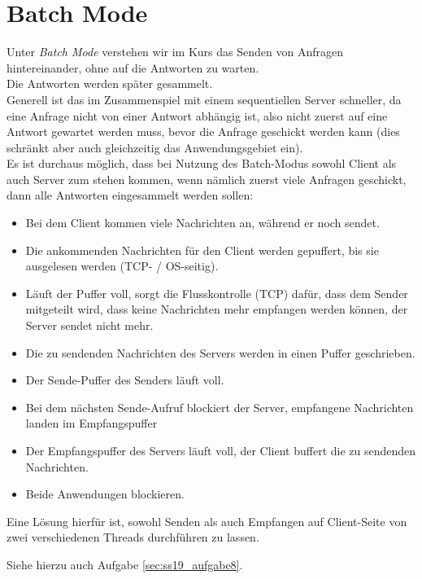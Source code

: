 \section{Batch Mode}

Unter \textit{Batch Mode} verstehen wir im Kurs das Senden von Anfragen hintereinander, ohne auf die Antworten zu warten.\\
Die Antworten werden später gesammelt.\\
Generell ist das im Zusammenspiel mit einem sequentiellen Server schneller, da eine Anfrage nicht von einer Antwort abhängig ist, also nicht zuerst auf eine Antwort gewartet werden muss, bevor die Anfrage geschickt werden kann (dies schränkt aber auch gleichzeitig das Anwendungsgebiet ein).\\
Es ist durchaus möglich, dass bei Nutzung des Batch-Modus sowohl Client als auch Server zum stehen kommen, wenn nämlich zuerst viele Anfragen geschickt, dann alle Antworten eingesammelt werden sollen:\\

\begin{itemize}
    \item Bei dem Client kommen viele Nachrichten an, während er noch sendet.
    \item Die ankommenden Nachrichten für den Client werden gepuffert, bis sie ausgelesen werden (TCP- / OS-seitig).
    \item Läuft der Puffer voll, sorgt die Flusskontrolle (TCP) dafür, dass dem Sender mitgeteilt wird, dass keine Nachrichten mehr empfangen werden können, der Server sendet nicht mehr.
    \item Die zu sendenden Nachrichten des Servers werden in einen Puffer geschrieben.
    \item Der Sende-Puffer des Senders läuft voll.
    \item Bei dem nächsten Sende-Aufruf blockiert der Server, empfangene Nachrichten landen im Empfangspuffer
    \item Der Empfangspuffer des Servers läuft voll, der Client buffert die zu sendenden Nachrichten.
    \item Beide Anwendungen blockieren.
\end{itemize}

\noindent
Eine Lösung hierfür ist, sowohl Senden als auch Empfangen auf Client-Seite von zwei verschiedenen Threads durchführen zu lassen.

\noindent
Siehe hierzu auch Aufgabe \ref{sec:ss19_aufgabe8}.

